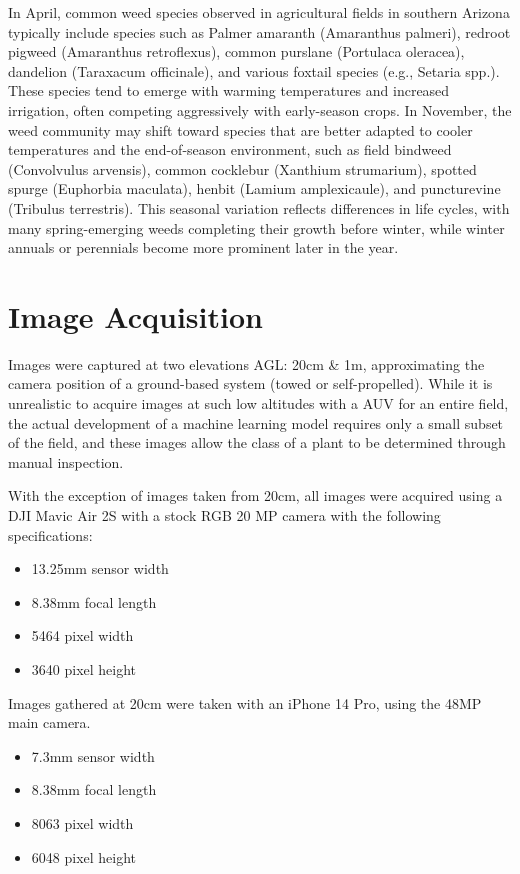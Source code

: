 \documentclass[letterpaper, notitlepage]{report}
\begin{document}
In April, common weed species observed in agricultural fields in southern Arizona typically include species such as Palmer amaranth (Amaranthus palmeri), redroot pigweed (Amaranthus retroflexus), common purslane (Portulaca oleracea), dandelion (Taraxacum officinale), and various foxtail species (e.g., Setaria spp.). These species tend to emerge with warming temperatures and increased irrigation, often competing aggressively with early-season crops. In November, the weed community may shift toward species that are better adapted to cooler temperatures and the end-of-season environment, such as field bindweed (Convolvulus arvensis), common cocklebur (Xanthium strumarium), spotted spurge (Euphorbia maculata), henbit (Lamium amplexicaule), and puncturevine (Tribulus terrestris). This seasonal variation reflects differences in life cycles, with many spring-emerging weeds completing their growth before winter, while winter annuals or perennials become more prominent later in the year.


\section{Image Acquisition}
Images were captured at two elevations \gls{AGL}: 20cm \& 1m, approximating the camera position of a ground-based system (towed or self-propelled). While it is unrealistic to acquire images at such low altitudes with a AUV for an entire field, the actual development of a machine learning model requires only a small subset of the field, and these images allow the class of a plant to be determined through manual inspection.

With the exception of images taken from 20cm, all images were acquired using a DJI Mavic Air 2S with a stock RGB 20 MP camera with the following specifications:

\begin{itemize}
	\item{13.25mm sensor width}
	\item{8.38mm focal length}
	\item{5464 pixel width}
	\item{3640 pixel height}
\end{itemize}

Images gathered at 20cm were taken with an iPhone 14 Pro, using the 48MP main camera.

\begin{itemize}
	\item{7.3mm sensor width}
	\item{8.38mm focal length}
	\item{8063 pixel width}
	\item{6048 pixel height}
\end{itemize}
\end{document}
